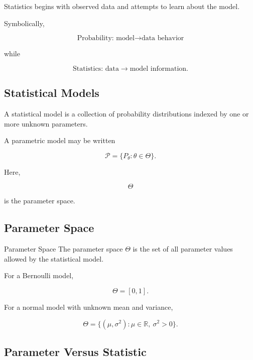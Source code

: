Statistics begins with observed data and attempts to learn about the
model.

Symbolically,

\[
\boxed{
\text{Probability: model}
\longrightarrow
\text{data behavior}
}
\]

while

\[
\boxed{
\text{Statistics: data}
\longrightarrow
\text{model information}.
}
\]

\subsection{Statistical Models}
\label{subsec:statistical-models}

A statistical model is a collection of probability distributions indexed
by one or more unknown parameters.

A parametric model may be written

\[
\boxed{
\mathcal{P}
=
\{
P_\theta:
\theta\in\Theta
\}.
}
\]

Here,

\[
\Theta
\]

is the parameter space.

\subsection{Parameter Space}
\label{subsec:parameter-space}

\begin{definitionbox}{Parameter Space}
The parameter space \(\Theta\) is the set of all parameter values allowed
by the statistical model.
\end{definitionbox}

For a Bernoulli model,

\[
\boxed{
\Theta=[0,1].
}
\]

For a normal model with unknown mean and variance,

\[
\boxed{
\Theta
=
\{
(\mu,\sigma^2):
\mu\in\mathbb{R},
\ \sigma^2>0
\}.
}
\]

\subsection{Parameter Versus Statistic}
\label{subsec:parameter-versus-statistic}

